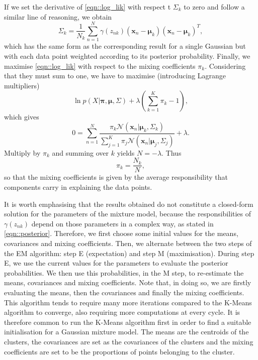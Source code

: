 \documentclass[a4paper]{article}
\begin{document}
 	If we set the derivative of \eqref{eqn::log_lik} with respect t $\Sigma_{k}$ to zero and follow a similar line of reasoning, we obtain
 	\begin{equation*}
 	\Sigma_{k} = \frac{1}{N_{k}} \sum_{n=1}^{N} \gamma \left( z_{nk} \right) \left( \boldsymbol{x}_{n} - \boldsymbol{\mu}_{k} \right) \left( \boldsymbol{x}_{n} - \boldsymbol{\mu}_{k} \right)^{T},
 	\end{equation*}
 	which has the same form as the corresponding result for a single Gaussian but with each data point weighted according to its posterior probability.
 	Finally, we maximise \eqref{eqn::log_lik} with respect to the mixing coefficients $\pi_{k}$. Considering that they must sum to one, we have to maximise (introducing Lagrange multipliers)
 	\begin{equation*}
 	\ln p \left( X | \boldsymbol{\pi}, \boldsymbol{\mu}, \Sigma  \right) + 
 	\lambda \left( \sum_{k=1}^{K} \pi_{k} - 1 \right),
 	\end{equation*}
 	which gives
 	\begin{equation*}
 	0 = \sum_{n=1}^{N} \frac{ \pi_{k}  \mathcal{N} \left( \boldsymbol{x}_{n} | \boldsymbol{\mu}_{k}, \Sigma_{k} \right)}{\sum_{j=1}^{K} \pi_{j} \mathcal{N} \left( \boldsymbol{x}_{n} | \boldsymbol{\mu}_{j}, \Sigma_{j} \right)} + \lambda.
 	\end{equation*}
 	Multiply by $\pi_{k}$ and summing over $k$ yields $N = - \lambda$. Thus
 	\begin{equation*}
 	\pi_{k} = \frac{N_{k}}{N},
 	\end{equation*}
 	so that the mixing coefficients is given by the average responsibility that components carry in explaining the data points.
 	
 	It is worth emphasising that the results obtained do not constitute a closed-form solution for the parameters of the mixture model, because the responsibilities of $\gamma \left( z_{nk} \right)$ depend on those parameters in a complex way, as stated in \eqref{eqn::posterior}.
 	Therefore, we first choose some initial values for the means, covariances and mixing coefficients. Then, we alternate between the two steps of the EM algorithm: step E (expectation) and step M (maximisation).
 	During step E, we use the current values for the parameters to evaluate the posterior probabilities. We then use this probabilities, in the M step, to re-estimate the means, covariances and mixing coefficients.
 	Note that, in doing so, we are firstly evaluating the means, then the covariances and finally the mixing coefficients.
 	This algorithm tends to require many more iterations compared to the K-Means algorithm to converge, also requiring more computations at every cycle. It is therefore common to run the K-Means algorithm first in order to find a suitable initialisation for a Gaussian mixture model.
 	The means are the centroids of the clusters, the covariances are set as the covariances of the clusters and the mixing coefficients are set to be the proportions of points belonging to the cluster.
	
		
\end{document}
